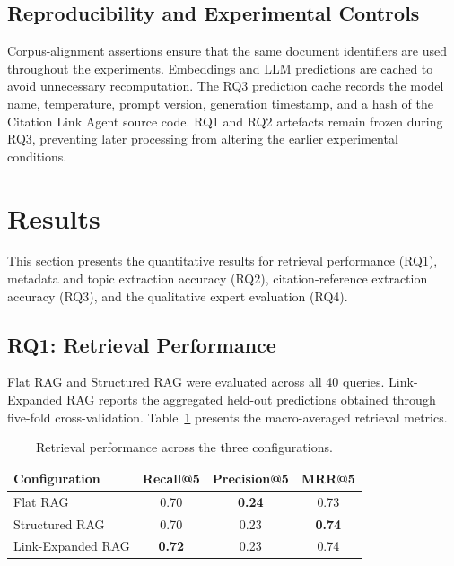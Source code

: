 \documentclass[runningheads]{llncs}
\begin{document}
\subsection{Reproducibility and Experimental Controls}
\label{sec:reproducibility}

Corpus-alignment assertions ensure that the same document identifiers are used throughout the experiments. Embeddings and LLM predictions are cached to avoid unnecessary recomputation. The RQ3 prediction cache records the model name, temperature, prompt version, generation timestamp, and a hash of the Citation Link Agent source code. RQ1 and RQ2 artefacts remain frozen during RQ3, preventing later processing from altering the earlier experimental conditions.

\section{Results}
\label{sec:results}

This section presents the quantitative results for retrieval performance (RQ1), metadata and topic extraction accuracy (RQ2), citation-reference extraction accuracy (RQ3), and the qualitative expert evaluation (RQ4).

\subsection{RQ1: Retrieval Performance}
\label{sec:rq1_results}

Flat RAG and Structured RAG were evaluated across all 40 queries. Link-Expanded RAG reports the aggregated held-out predictions obtained through five-fold cross-validation. Table~\ref{tab:rq1_results} presents the macro-averaged retrieval metrics.

\begin{table}[!htbp]
\centering
\caption{Retrieval performance across the three configurations.}
\label{tab:rq1_results}
\begin{tabular}{lccc}
\toprule
\textbf{Configuration} & \textbf{Recall@5} & \textbf{Precision@5} & \textbf{MRR@5} \\
\midrule
Flat RAG & 0.70 & \textbf{0.24} & 0.73 \\
Structured RAG & 0.70 & 0.23 & \textbf{0.74} \\
Link-Expanded RAG & \textbf{0.72} & 0.23 & 0.74 \\
\bottomrule
\end{tabular}
\end{table}
\end{document}
